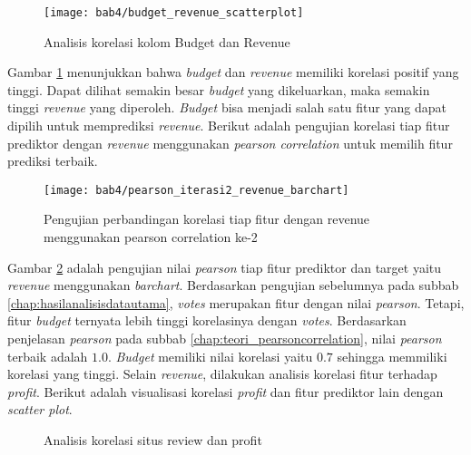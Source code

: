 \begin{figure}[H]
	\centering  
	\texttt{[image: bab4/budget\_revenue\_scatterplot]}   
	\caption{Analisis korelasi kolom Budget dan Revenue}
	\label{fig:budget_revenue_scatterplot} 
\end{figure} 

Gambar \ref{fig:budget_revenue_scatterplot} menunjukkan bahwa \textit{budget} dan \textit{revenue} memiliki korelasi positif yang tinggi. Dapat dilihat semakin besar \textit{budget} yang dikeluarkan, maka semakin tinggi \textit{revenue} yang diperoleh. \textit{Budget} bisa menjadi salah satu fitur yang dapat dipilih untuk memprediksi \textit{revenue}. Berikut adalah pengujian korelasi tiap fitur prediktor dengan \textit{revenue} menggunakan \textit{pearson correlation} untuk memilih fitur prediksi terbaik. 


\begin{figure}[H]
	\centering  
	\texttt{[image: bab4/pearson\_iterasi2\_revenue\_barchart]}   
	\caption{Pengujian perbandingan korelasi tiap fitur dengan revenue menggunakan pearson correlation ke-2}
	\label{fig:pearson_iterasi2_revenue_barchart} 
\end{figure} 

Gambar \ref{fig:pearson_iterasi2_revenue_barchart} adalah pengujian nilai \textit{pearson} tiap fitur prediktor dan target yaitu \textit{revenue} menggunakan \textit{barchart}. Berdasarkan pengujian sebelumnya pada subbab \ref{chap:hasilanalisisdatautama}, \textit{votes} merupakan fitur dengan nilai \textit{pearson}. Tetapi, fitur \textit{budget} ternyata lebih tinggi korelasinya dengan \textit{votes}. Berdasarkan penjelasan \textit{pearson} pada subbab \ref{chap:teori_pearsoncorrelation}, nilai \textit{pearson} terbaik adalah $1.0$. \textit{Budget} memiliki nilai korelasi yaitu $0.7$ sehingga memmiliki korelasi yang tinggi. Selain \textit{revenue},  dilakukan analisis korelasi fitur terhadap \textit{profit}. 
Berikut adalah visualisasi korelasi \textit{profit} dan fitur prediktor lain dengan \textit{scatter plot}. 


\begin{figure}[H]
    \centering
    \qquad
    \caption{Analisis korelasi situs review dan profit}%
    \label{fig:rating_metascore_profit_scatterplot}%
\end{figure}



